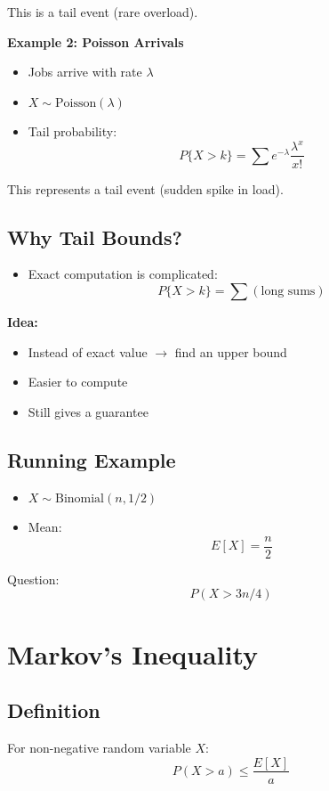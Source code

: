 \documentclass[11pt]{article}
\begin{document}
This is a tail event (rare overload).

\textbf{Example 2: Poisson Arrivals}
\begin{itemize}
\item Jobs arrive with rate $\lambda$
\item $X \sim \text{Poisson}(\lambda)$
\item Tail probability:
\[
P\{X > k\} = \sum e^{-\lambda} \frac{\lambda^x}{x!}
\]
\end{itemize}

This represents a tail event (sudden spike in load).

\subsection{Why Tail Bounds?}
\begin{itemize}
\item Exact computation is complicated:
\[
P\{X > k\} = \sum (\text{long sums})
\]
\end{itemize}

\textbf{Idea:}
\begin{itemize}
\item Instead of exact value $\rightarrow$ find an upper bound
\item Easier to compute
\item Still gives a guarantee
\end{itemize}

\subsection{Running Example}
\begin{itemize}
\item $X \sim \text{Binomial}(n, 1/2)$
\item Mean:
\[
E[X] = \frac{n}{2}
\]
\end{itemize}

Question:
\[
P(X > 3n/4)
\]

\section{Markov's Inequality}

\subsection{Definition}
For non-negative random variable $X$:
\[
P(X > a) \leq \frac{E[X]}{a}
\]
\end{document}
